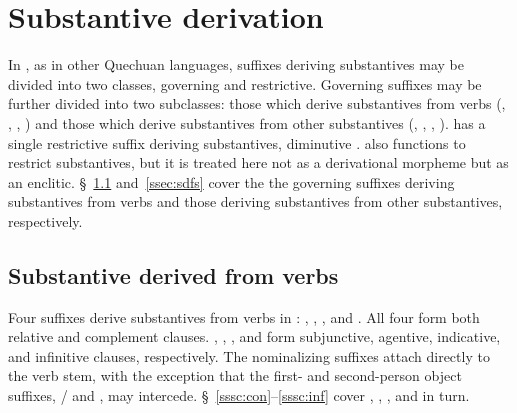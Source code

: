 {\section{Substantive derivation}
In \SYQ{}, as in other Quechuan languages, suffixes deriving substantives may be divided into two classes, governing and restrictive. Governing suffixes may be further divided into two subclasses: those which derive substantives from verbs (, , , ) and those which derive substantives from other substantives (, , , ). \SYQ{} has a single restrictive suffix deriving substantives, diminutive .  also functions to restrict substantives, but it is treated here not as a derivational morpheme but as an enclitic. \S~\ref{ssec:sdfv} and~\ref{ssec:sdfs} cover the the governing suffixes deriving substantives from verbs and those deriving substantives from other substantives, respectively.

\subsection{Substantive derived from verbs}\label{ssec:sdfv}
Four suffixes derive substantives from verbs in \SYQ{}: , , , and . All four form both relative and complement clauses. , , , and  form subjunctive, agentive, indicative, and infinitive clauses, respectively. The nominalizing suffixes attach directly to the verb stem, with the exception that the first- and second-person object suffixes, / and , may intercede. \S~\ref{sssc:con}--\ref{sssc:inf} cover , , , and  in turn.

}
